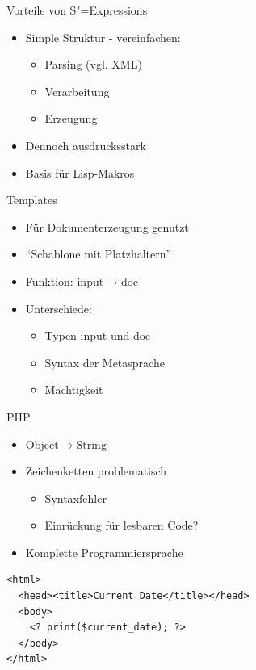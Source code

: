 \documentclass{beamer}
\newcommand{\pfeil}{\item[$\Rightarrow$]}
\newcommand\ato{\rightarrow} %
\newcommand{\sexps}{S"=Expressions}
\begin{document}
\begin{frame}{Vorteile von \sexps{}}
  \begin{itemize}
  \item Simple Struktur - vereinfachen:
    \begin{itemize}
     \item Parsing (vgl. XML)
    \item Verarbeitung
    \item Erzeugung
    \end{itemize}
  \item Dennoch ausdrucksstark
    \pfeil Basis für Lisp-Makros
  \end{itemize}
\end{frame}

\begin{frame}[fragile]{Templates}
  \begin{itemize}
  \item Für Dokumenterzeugung genutzt
  \item ``Schablone mit Platzhaltern''
  \item Funktion: $\mathrm{input} \ato \mathrm{doc}$
  \item Unterschiede:
    \begin{itemize}
    \item Typen $\mathrm{input}$ und $\mathrm{doc}$
    \item Syntax der Metasprache
    \item Mächtigkeit
    \end{itemize}
  \end{itemize}
\end{frame}

\begin{frame}[fragile]{PHP}
  \begin{itemize}
  \item $\mathrm{Object}\ato\mathrm{String}$
  \item Zeichenketten problematisch
    \begin{itemize}
    \item Syntaxfehler
    \item Einrückung für lesbaren Code?
    \end{itemize}
  \item Komplette Programmiersprache
  \end{itemize}
\begin{verbatim}
<html>
  <head><title>Current Date</title></head>
  <body>
    <? print($current_date); ?>
  </body>
</html>
\end{verbatim}
\end{frame}
\end{document}
